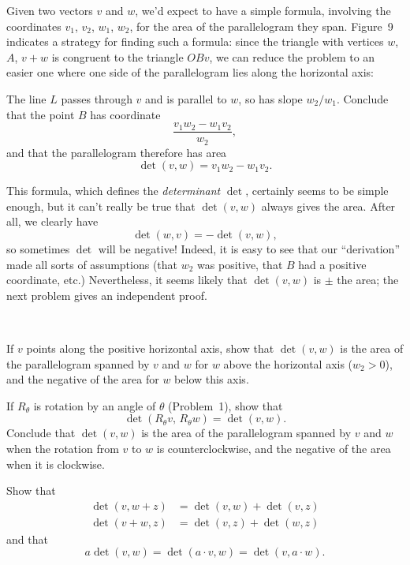  Given two vectors $v$ and $w$, we'd expect to have a simple formula,
involving the coordinates $v_1$, $v_2$, $w_1$, $w_2$, for the area of the
parallelogram they span. Figure~9 indicates a strategy for finding such a
formula: since the triangle with vertices $w$, $A$, $v+w$ is congruent to the
triangle $OBv$, we can reduce the problem to an easier one where one side of
the parallelogram lies along the horizontal axis:
\begin{letters}
\item The line $L$ passes through $v$ and is parallel to $w$, so has slope
  $w_2/w_1$. Conclude that the point $B$ has coordinate
  \[
  \frac{v_1w_2-w_1v_2}{w_2},
  \]
  and that the parallelogram therefore has area
  \[
  \det(v,w)=v_1w_2-w_1v_2.
  \]
\end{letters}
This formula, which defines the \emph{determinant} $\det$, certainly seems to
be simple enough, but it can't really be true that $\det(v,w)$ always gives the
area. After all, we clearly have
\[
\det(w,v)=-\det(v,w),
\]
so sometimes $\det$ will be negative! Indeed, it is easy to see that our
``derivation'' made all sorts of assumptions (that $w_2$ was positive, that $B$
had a positive coordinate, etc.) Nevertheless, it seems likely that
$\det(v,w)$ is $\pm$ the area; the next problem gives an independent proof.

\begin{center}
\\[0.6em]
\end{center}

\begin{letters}
\item If $v$ points along the positive horizontal axis, show that $\det(v,w)$
  is the area of the parallelogram spanned by $v$ and $w$ for $w$ above the
  horizontal axis ($w_2>0$), and the negative of the area for $w$ below this
  axis.
\item If $R_{\theta}$ is rotation by an angle of $\theta$ (Problem~1), show that
  \[
  \det(R_{\theta}v,\,R_{\theta}w)=\det(v,w).
  \]
  Conclude that $\det(v,w)$ is the area of the parallelogram spanned by $v$ and
  $w$ when the rotation from $v$ to $w$ is counterclockwise, and the negative
  of the area when it is clockwise.
\end{letters}

 Show that
\begin{align*}
\det(v,w+z)&=\det(v,w)+\det(v,z)\\
\det(v+w,z)&=\det(v,z)+\det(w,z)
\end{align*}
and that
\[
a\det(v,w)=\det(a\cdot v,w)=\det(v,a\cdot w).
\]

